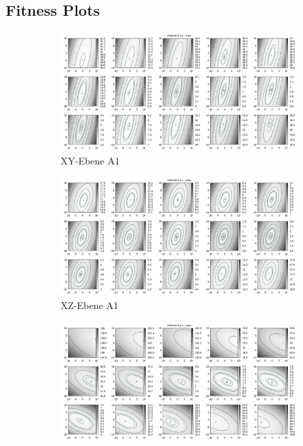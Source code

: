 \begin{appendix}
\chapter{Fitness Plots}
\label{app:fitness:plots1}
\newpage
\begin{landscape}
\begin{figure}[!ht]
	\centering
	\begin{subfigure}[t]{0.5\textheight}
	     \centering
	     \includegraphics[width=\textwidth]{img/fitness/xy/a0.png}
	             \caption{XY-Ebene A1}
	\end{subfigure}
	\begin{subfigure}[t]{0.5\textheight}
		\centering
	     \includegraphics[width=\textwidth]{img/fitness/xz/a0.png}
				\caption{XZ-Ebene A1}
	\end{subfigure}
	\begin{subfigure}[t]{0.5\textheight}
			\centering
	   \includegraphics[width=\textwidth]{img/fitness/yz/a0.png}

\end{subfigure}
\end{figure}
\end{landscape}
\end{appendix}
